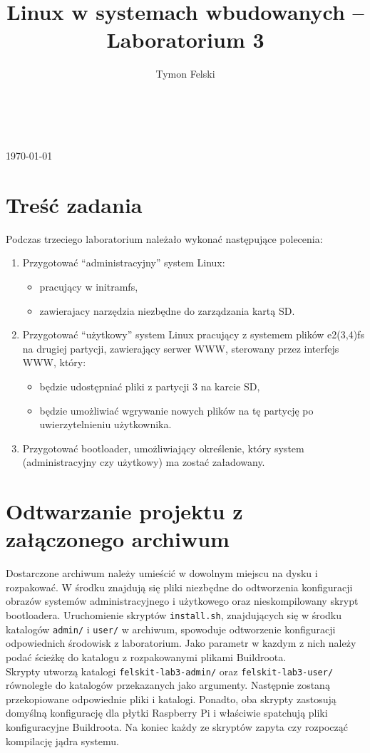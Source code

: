 \documentclass[10pt,a4paper]{article}
\title{Linux w systemach wbudowanych -- Laboratorium 3}
\author{Tymon Felski}
\begin{document}
\makeatletter
\begin{center}
	\LARGE{\@title}\\
	\vspace{.4cm}
	\Large{\@author}\\
	\vspace{.2cm}
	\large{\today}
\end{center}
\makeatother

\section{Treść zadania}
Podczas trzeciego laboratorium należało wykonać następujące polecenia:
\begin{enumerate}
	\item Przygotować ``administracyjny'' system Linux:
	\begin{itemize}
		\item pracujący w initramfs,
		\item zawierajacy narzędzia niezbędne do zarządzania kartą SD.
	\end{itemize}
	\item Przygotować ``użytkowy'' system Linux pracujący z systemem plików e2(3,4)fs na drugiej partycji, zawierający serwer WWW, sterowany przez interfejs WWW, który:
	\begin{itemize}
		\item będzie udostępniać pliki z partycji 3 na karcie SD,
		\item będzie umożliwiać wgrywanie nowych plików na tę partycję po uwierzytelnieniu użytkownika.
	\end{itemize}
	\item Przygotować bootloader, umożliwiający określenie, który system (administracyjny czy użytkowy) ma zostać załadowany.
\end{enumerate}

\section{Odtwarzanie projektu z załączonego archiwum}
Dostarczone archiwum należy umieścić w dowolnym miejscu na dysku i rozpakować. W środku znajdują się pliki niezbędne do odtworzenia konfiguracji obrazów systemów administracyjnego i użytkowego oraz nieskompilowany skrypt bootloadera. Uruchomienie skryptów \texttt{install.sh}, znajdujących się w środku katalogów \texttt{admin/} i \texttt{user/} w archiwum, spowoduje odtworzenie konfiguracji odpowiednich środowisk z laboratorium. Jako parametr w kazdym z nich należy podać ścieżkę do katalogu z rozpakowanymi plikami Buildroota.\\[\baselineskip]
Skrypty utworzą katalogi \texttt{felskit-lab3-admin/} oraz \texttt{felskit-lab3-user/} równoległe do katalogów przekazanych jako argumenty. Następnie zostaną przekopiowane odpowiednie pliki i katalogi. Ponadto, oba skrypty zastosują domyślną konfigurację dla płytki Raspberry Pi i właściwie spatchują pliki konfiguracyjne Buildroota. Na koniec każdy ze skryptów zapyta czy rozpocząć kompilację jądra systemu.
\end{document}
